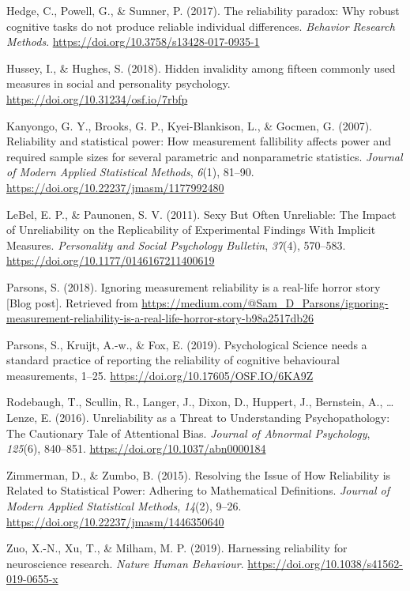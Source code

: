 \documentclass[english,,man]{apa6}
\begin{document}
\leavevmode\hypertarget{ref-Hedge2017}{}%
Hedge, C., Powell, G., \& Sumner, P. (2017). The reliability paradox: Why robust cognitive tasks do not produce reliable individual differences. \emph{Behavior Research Methods}. \url{https://doi.org/10.3758/s13428-017-0935-1}

\leavevmode\hypertarget{ref-hussey_hidden_2018}{}%
Hussey, I., \& Hughes, S. (2018). Hidden invalidity among fifteen commonly used measures in social and personality psychology. \url{https://doi.org/10.31234/osf.io/7rbfp}

\leavevmode\hypertarget{ref-Kanyongo2007}{}%
Kanyongo, G. Y., Brooks, G. P., Kyei-Blankison, L., \& Gocmen, G. (2007). Reliability and statistical power: How measurement fallibility affects power and required sample sizes for several parametric and nonparametric statistics. \emph{Journal of Modern Applied Statistical Methods}, \emph{6}(1), 81--90. \url{https://doi.org/10.22237/jmasm/1177992480}

\leavevmode\hypertarget{ref-LeBel2011}{}%
LeBel, E. P., \& Paunonen, S. V. (2011). Sexy But Often Unreliable: The Impact of Unreliability on the Replicability of Experimental Findings With Implicit Measures. \emph{Personality and Social Psychology Bulletin}, \emph{37}(4), 570--583. \url{https://doi.org/10.1177/0146167211400619}

\leavevmode\hypertarget{ref-Parsons2018}{}%
Parsons, S. (2018). Ignoring measurement reliability is a real-life horror story {[}Blog post{]}. Retrieved from \url{https://medium.com/@Sam_D_Parsons/ignoring-measurement-reliability-is-a-real-life-horror-story-b98a2517db26}

\leavevmode\hypertarget{ref-Parsons2018a}{}%
Parsons, S., Kruijt, A.-w., \& Fox, E. (2019). Psychological Science needs a standard practice of reporting the reliability of cognitive behavioural measurements, 1--25. \url{https://doi.org/10.17605/OSF.IO/6KA9Z}

\leavevmode\hypertarget{ref-Rodebaugh2016}{}%
Rodebaugh, T., Scullin, R., Langer, J., Dixon, D., Huppert, J., Bernstein, A., \ldots{} Lenze, E. (2016). Unreliability as a Threat to Understanding Psychopathology: The Cautionary Tale of Attentional Bias. \emph{Journal of Abnormal Psychology}, \emph{125}(6), 840--851. \url{https://doi.org/10.1037/abn0000184}

\leavevmode\hypertarget{ref-Zimmerman2015}{}%
Zimmerman, D., \& Zumbo, B. (2015). Resolving the Issue of How Reliability is Related to Statistical Power: Adhering to Mathematical Definitions. \emph{Journal of Modern Applied Statistical Methods}, \emph{14}(2), 9--26. \url{https://doi.org/10.22237/jmasm/1446350640}

\leavevmode\hypertarget{ref-zuo_harnessing_2019}{}%
Zuo, X.-N., Xu, T., \& Milham, M. P. (2019). Harnessing reliability for neuroscience research. \emph{Nature Human Behaviour}. \url{https://doi.org/10.1038/s41562-019-0655-x}
\end{document}
